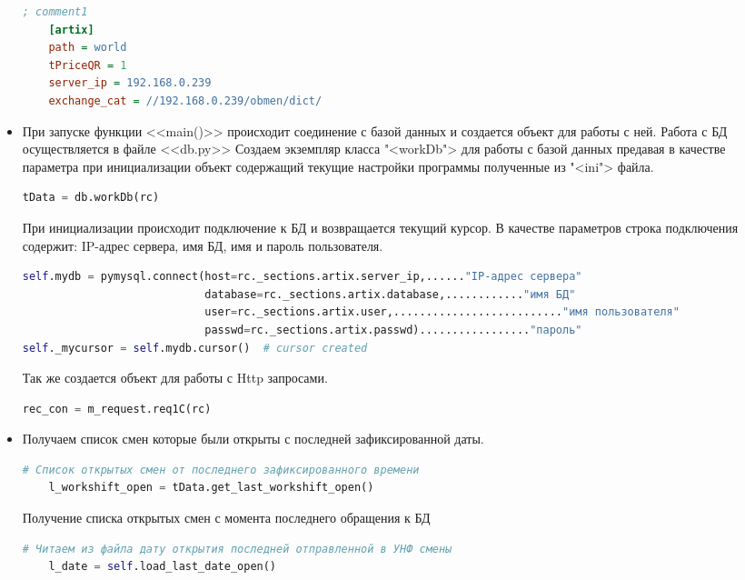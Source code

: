 \begin{itemize}
   \begin{lstlisting}[language={Ini}]
	; comment1
	[artix]
	path = world
	tPriceQR = 1
	server_ip = 192.168.0.239
	exchange_cat = //192.168.0.239/obmen/dict/
\end{lstlisting}

\item При запуске функции <<main()>> происходит соединение с базой данных и создается объект для работы с ней. Работа с БД осуществляется в файле <<db.py>>
Создаем экземпляр класса "<workDb"> для работы с базой данных предавая в качестве параметра при инициализации объект содержащий текущие настройки программы полученные из "<ini"> файла.
\newline
	\begin{lstlisting}[language=Python, caption=Создание объекта БД]
    tData = db.workDb(rc)
	\end{lstlisting}


При инициализации происходит подключение к БД и возвращается текущий курсор.
В качестве параметров строка подключения содержит: IP-адрес сервера, имя БД, имя и пароль пользователя.
\newline
	\begin{lstlisting}[language=Python, caption=Соединение с БД]
self.mydb = pymysql.connect(host=rc._sections.artix.server_ip,......"IP-адрес сервера"
							database=rc._sections.artix.database,............"имя БД"
							user=rc._sections.artix.user,.........................."имя пользователя"
							passwd=rc._sections.artix.passwd)................."пароль"
self._mycursor = self.mydb.cursor()  # cursor created
	\end{lstlisting}




%	
Так же создается объект для работы с Http запросами.


	\begin{lstlisting}[language=Python, caption=Объект запрос]
	rec_con = m_request.req1C(rc)
		\end{lstlisting}


\item Получаем список смен которые были открыты с последней зафиксированной даты.

	\begin{lstlisting}[language=Python, caption=Список открытых смен]
	# Список открытых смен от последнего зафиксированного времени
	l_workshift_open = tData.get_last_workshift_open()
	\end{lstlisting}

\newpage
Получение списка открытых смен с момента последнего обращения к БД
\newline
	\begin{lstlisting}[language=Python, caption=Смены из БД]
	# Читаем из файла дату открытия последней отправленной в УНФ смены
	l_date = self.load_last_date_open()


\end{lstlisting}
\end{itemize}
